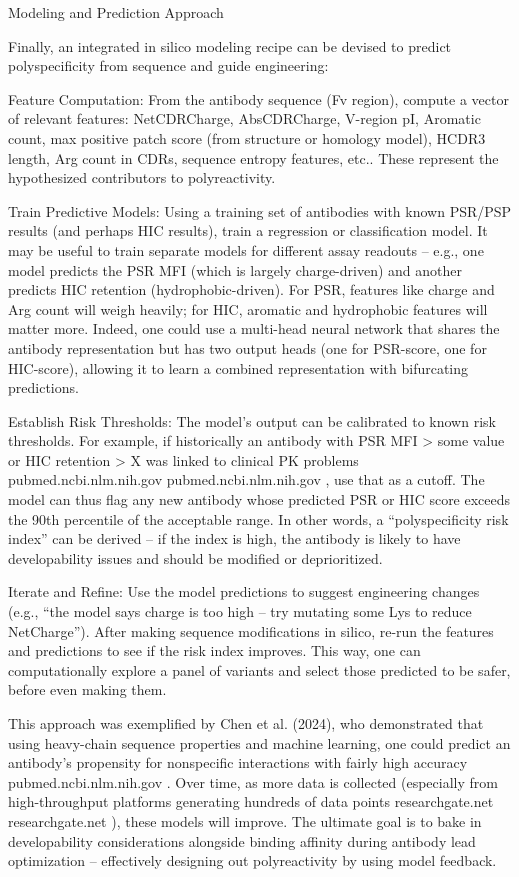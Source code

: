 Modeling and Prediction Approach

Finally, an integrated in silico modeling recipe can be devised to predict polyspecificity from sequence and guide engineering:

Feature Computation: From the antibody sequence (Fv region), compute a vector of relevant features: {NetCDRCharge, AbsCDRCharge, V-region pI, Aromatic count, max positive patch score (from structure or homology model), HCDR3 length, Arg count in CDRs, sequence entropy features, etc.}. These represent the hypothesized contributors to polyreactivity.

Train Predictive Models: Using a training set of antibodies with known PSR/PSP results (and perhaps HIC results), train a regression or classification model. It may be useful to train separate models for different assay readouts – e.g., one model predicts the PSR MFI (which is largely charge-driven) and another predicts HIC retention (hydrophobic-driven). For PSR, features like charge and Arg count will weigh heavily; for HIC, aromatic and hydrophobic features will matter more. Indeed, one could use a multi-head neural network that shares the antibody representation but has two output heads (one for PSR-score, one for HIC-score), allowing it to learn a combined representation with bifurcating predictions.

Establish Risk Thresholds: The model’s output can be calibrated to known risk thresholds. For example, if historically an antibody with PSR MFI > some value or HIC retention > X was linked to clinical PK problems
pubmed.ncbi.nlm.nih.gov
pubmed.ncbi.nlm.nih.gov
, use that as a cutoff. The model can thus flag any new antibody whose predicted PSR or HIC score exceeds the 90th percentile of the acceptable range. In other words, a “polyspecificity risk index” can be derived – if the index is high, the antibody is likely to have developability issues and should be modified or deprioritized.

Iterate and Refine: Use the model predictions to suggest engineering changes (e.g., “the model says charge is too high – try mutating some Lys to reduce NetCharge”). After making sequence modifications in silico, re-run the features and predictions to see if the risk index improves. This way, one can computationally explore a panel of variants and select those predicted to be safer, before even making them.

This approach was exemplified by Chen et al. (2024), who demonstrated that using heavy-chain sequence properties and machine learning, one could predict an antibody’s propensity for nonspecific interactions with fairly high accuracy
pubmed.ncbi.nlm.nih.gov
. Over time, as more data is collected (especially from high-throughput platforms generating hundreds of data points
researchgate.net
researchgate.net
), these models will improve. The ultimate goal is to bake in developability considerations alongside binding affinity during antibody lead optimization – effectively designing out polyreactivity by using model feedback.

